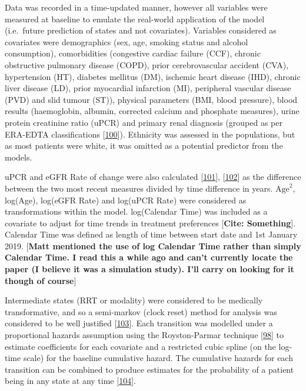 \documentclass[12pt,PhD,twoside,openright]{muthesis}
\begin{document}
Data was recorded in a time-updated manner, however all variables were measured at baseline to emulate the real-world application of the model (i.e.~future prediction of states and not covariates). Variables considered as covariates were demographics (sex, age, smoking status and alcohol consumption), comorbidities (congestive cardiac failure (CCF), chronic obstructive pulmonary disease (COPD), prior cerebrovascular accident (CVA), hypertension (HT), diabetes mellitus (DM), ischemic heart disease (IHD), chronic liver disease (LD), prior myocardial infarction (MI), peripheral vascular disease (PVD) and slid tumour (ST)), physical parameters (BMI, blood pressure), blood results (haemoglobin, albumin, corrected calcium and phosphate measures), urine protein creatinine ratio (uPCR) and primary renal diagnosis (grouped as per ERA-EDTA classifications {[}\protect\hyperlink{ref-venkat-raman_new_2012}{100}{]}). Ethnicity was assessed in the populations, but as most patients were white, it was omitted as a potential predictor from the models.

uPCR and eGFR Rate of change were also calculated {[}\protect\hyperlink{ref-kovesdy_past_2016}{101}{]}, {[}\protect\hyperlink{ref-naimark_past_2016}{102}{]} as the difference between the two most recent measures divided by time difference in years. \(\textrm{Age}^2\), log(Age), log(eGFR Rate) and log(uPCR Rate) were considered as transformations within the model. log(Calendar Time) was included as a covariate to adjust for time trends in treatment preferences {[}\textbf{Cite: Something}{]}. Calendar Time was defined as length of time between start date and 1st January 2019. {[}\textbf{Matt mentioned the use of log Calendar Time rather than simply Calendar Time. I read this a while ago and can't currently locate the paper (I believe it was a simulation study). I'll carry on looking for it though of course}{]}

Intermediate states (RRT or modality) were considered to be medically transformative, and so a semi-markov (clock reset) method for analysis was considered to be well justified {[}\protect\hyperlink{ref-meira-machado_multi-state_2009}{103}{]}. Each transition was modelled under a proportional hazards assumption using the Royston-Parmar technique {[}\protect\hyperlink{ref-royston_flexible_2002}{98}{]} to estimate coefficients for each covariate and a restricted cubic spline (on the log-time scale) for the baseline cumulative hazard. The cumulative hazards for each transition can be combined to produce estimates for the probability of a patient being in any state at any time {[}\protect\hyperlink{ref-putter_tutorial_2007}{104}{]}.
\end{document}
